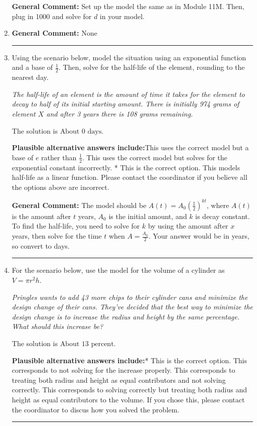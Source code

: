 \documentclass{extbook}[14pt]
\newcommand{\litem}[1]{\item #1

\rule{\textwidth}{0.4pt}}
\begin{document}
\begin{enumerate}
{\textbf{General Comment:} Set up the model the same as in Module 11M. Then, plug in 1000 and solve for $d$ in your model.
}
\litem{


\textbf{General Comment:} None
}
\litem{
Using the scenario below, model the situation using an exponential function and a base of $\frac{1}{2}$. Then, solve for the half-life of the element, rounding to the nearest day.

\begin{center}
    \textit{ The half-life of an element is the amount of time it takes for the element to decay to half of its initial starting amount. There is initially 974 grams of element $X$ and after 3 years there is 108 grams remaining. }
\end{center}
The solution is \( \text{About } 0 \text{ days} \).\begin{enumerate}[label=\Alph*.]
\textbf{Plausible alternative answers include:}This uses the correct model but a base of $e$ rather than $\frac{1}{2}$.
This uses the correct model but solves for the exponential constant incorrectly.
* This is the correct option.
This models half-life as a linear function.
Please contact the coordinator if you believe all the options above are incorrect.
\end{enumerate}

\textbf{General Comment:} The model should be $A(t) = A_0 (\frac{1}{2})^{kt}$, where $A(t)$ is the amount after $t$ years, $A_0$ is the initial amount, and $k$ is decay constant. To find the half-life, you need to solve for $k$ by using the amount after $x$ years, then solve for the time $t$ when $A = \frac{A_0}{2}$. Your answer would be in years, so convert to days.
}
\litem{
For the scenario below, use the model for the volume of a cylinder as $V = \pi r^2 h$.

\begin{center}
    \textit{ Pringles wants to add 43 \text{percent} more chips to their cylinder cans and minimize the design change of their cans. They've decided that the best way to minimize the design change is to increase the radius and height by the same percentage. What should this increase be? }
\end{center}
The solution is \( \text{About } 13 \text{ percent} \).\begin{enumerate}[label=\Alph*.]
\textbf{Plausible alternative answers include:}* This is the correct option.
This corresponds to not solving for the increase properly.
This corresponds to treating both radius and height as equal contributors and not solving correctly.
This corresponds to solving correctly but treating both radius and height as equal contributors to the volume.
If you chose this, please contact the coordinator to discus how you solved the problem.
\end{enumerate}

}
\end{enumerate}
\end{document}
